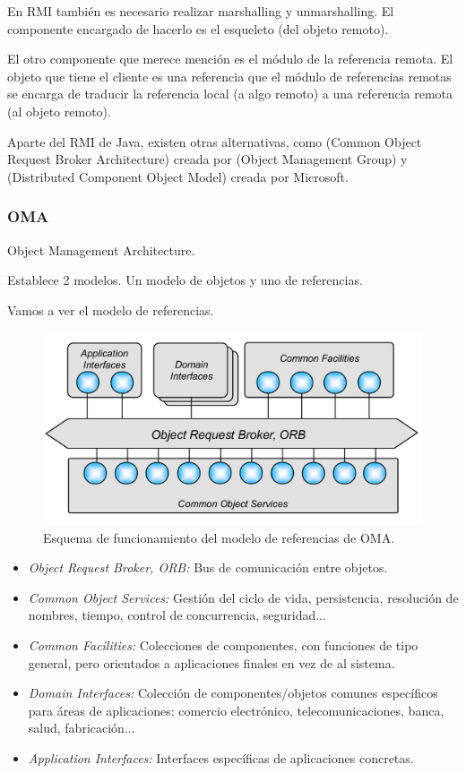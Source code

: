 En RMI también es necesario realizar marshalling y unmarshalling. El componente encargado de hacerlo es el esqueleto (del objeto remoto).

El otro componente que merece mención es el módulo de la referencia remota. El objeto que tiene el cliente es una referencia que el módulo de referencias remotas se encarga de traducir la referencia local (a algo remoto) a una referencia remota (al objeto remoto).

Aparte del RMI de Java, existen otras alternativas, como  (Common Object Request Broker Architecture) creada por  (Object Management Group) y  (Distributed Component Object Model) creada por Microsoft.

\subsubsection{OMA}
\begin{defn}[OMA]
Object Management Architecture.

Establece 2 modelos. Un modelo de objetos y uno de referencias.
\end{defn}

Vamos a ver el modelo de referencias.


\begin{figure}[hbtp]
\centering
\includegraphics[width=1\textwidth]{img/OMA_Ref.png}
\caption{Esquema de funcionamiento del modelo de referencias de OMA.}
\label{OMA}
\end{figure}

\begin{itemize}
	\item \textit{Object Request Broker, ORB:} Bus de comunicación entre objetos.
	\item \textit{Common Object Services:} Gestión del ciclo de vida, persistencia, resolución de nombres, tiempo, control de concurrencia, seguridad...
	\item \textit{Common Facilities:} Colecciones de componentes, con funciones de tipo general, pero orientados a aplicaciones finales en vez de al sistema.
	\item \textit{Domain Interfaces:} Colección de componentes/objetos comunes específicos para áreas de aplicaciones: comercio electrónico, telecomunicaciones, banca, salud, fabricación...
	\item \textit{Application Interfaces:} Interfaces específicas de aplicaciones concretas.
\end{itemize}

